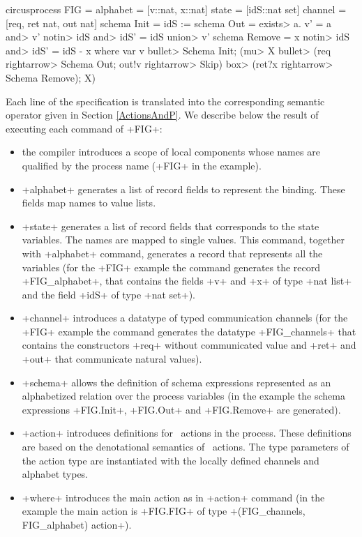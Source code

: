 \documentclass[11pt,a4paper]{article}
\begin{document}
\begin{isar}
circusprocess FIG =
  alphabet = [v::nat, x::nat]
  state = [idS::nat set]
  channel = [req, ret nat, out nat]
  schema Init = idS := {}
  schema Out = \<exists> a. v' = a \<and>   v' \<notin>  idS \<and>  idS' = idS \<union>  {v'}
  schema Remove = x \<notin>   idS \<and>  idS' = idS - {x}
  where var v \<bullet>  Schema Init; (\<mu> X \<bullet> (req \<rightarrow> Schema Out; out!v \<rightarrow> Skip) 
                                  \<box>  (ret?x \<rightarrow> Schema Remove); X)
\end{isar}
Each line of the specification is translated into the corresponding semantic operator given in Section \ref{ActionsAndP}. 
We describe below the result of executing each command of \inlineisar+FIG+:

\begin{itemize}
\item the compiler introduces a scope of local components whose names are qualified by the process name (\inlineisar+FIG+ in the example).
\item \inlineisar+alphabet+ generates a list of record fields to represent the binding. These fields map names to value lists.
\item \inlineisar+state+ generates a list of record fields that corresponds to the state variables. The names are mapped to single values. 
          This command, together with \inlineisar+alphabet+ command, generates a record that represents all the variables (for the \inlineisar+FIG+ 
          example the command generates the record \inlineisar+FIG_alphabet+, 
that contains the fields \inlineisar+v+ and \inlineisar+x+ of type \inlineisar+nat list+ and the field \inlineisar+idS+ of type \inlineisar+nat set+).
\item \inlineisar+channel+ introduces a datatype of typed communication channels (for the \inlineisar+FIG+ example the command generates 
the datatype \inlineisar+FIG_channels+ that contains the constructors \inlineisar+req+ without communicated value and \inlineisar+ret+ and \inlineisar+out+ that communicate natural values).
\item \inlineisar+schema+ allows the definition of schema expressions represented as an alphabetized relation over the process variables (in the example the schema expressions \inlineisar+FIG.Init+, 
\inlineisar+FIG.Out+ and \inlineisar+FIG.Remove+ are generated).
\item \inlineisar+action+ introduces definitions for \Circus\ actions in the process. These definitions are based on the denotational semantics of \Circus\ actions. The type parameters of the action 
type are instantiated with the locally defined channels and alphabet types.
\item \inlineisar+where+ introduces the main action as in \inlineisar+action+ command (in the example the main action is \inlineisar+FIG.FIG+ of type \inlineisar+(FIG_channels, FIG_alphabet) action+).
\end{itemize}
\end{document}
